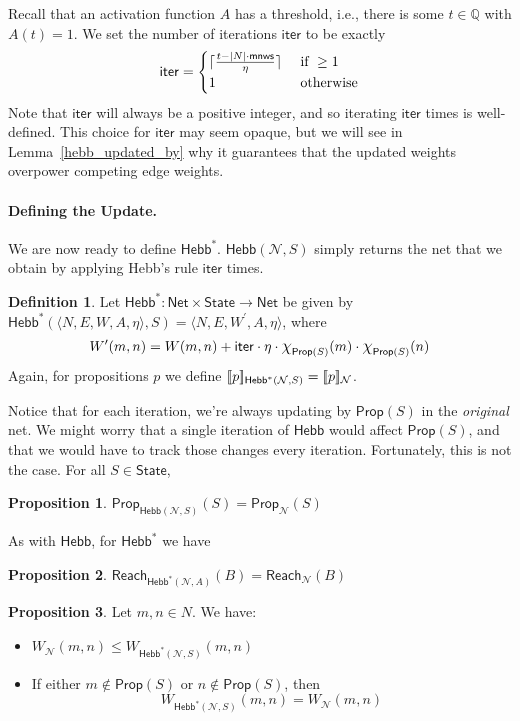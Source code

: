 \documentclass[letterpaper]{article}
\DeclarePairedDelimiter{\ceil}{\lceil}{\rceil}
\theoremstyle{definition}
\newtheorem{definition}{Definition}
\newtheorem{proposition}{Proposition}
\newcommand{\Rat}{\mathbb{Q}}
\newcommand{\State}{\mathsf{State}}
\newcommand{\semantics}[1]{[\![\mbox{\em $ #1 $\/}]\!]}
\newcommand*{\bigchi}{\mbox{\Large$\chi$}}%
\newcommand{\minscore}{\mathsf{mnws}}
\newcommand{\numiterations}{\mathsf{iter}}
\newcommand{\AllNets}{\mathsf{Net}}
\newcommand{\Net}{\mathcal{N}}
\newcommand{\Prop}{\mathsf{Prop}}
\newcommand{\Reach}{\mathsf{Reach}}
\newcommand{\Hebb}[2]{\mathsf{Hebb}(#1, #2)}
\newcommand{\HebbNoArgs}{\mathsf{Hebb}}
\newcommand{\Hebbstar}[2]{\mathsf{Hebb}^*(#1, #2)}
\newcommand{\HebbstarNoArgs}{\mathsf{Hebb}^*}
\begin{document}
Recall that an activation function $A$ has a threshold, i.e., there is some $t \in \Rat$ with $A(t) = 1$.  We set the number of iterations $\numiterations$ to be exactly
\[
    \numiterations = 
    \begin{cases}
        \ceil{\frac{t - |N| \cdot \minscore}{\eta}} & \mbox{ if } \geq 1\\
        1 & \mbox{ otherwise}
    \end{cases}
\]
Note that $\numiterations$ will always be a positive integer, and so iterating $\numiterations$ times is well-defined.  This choice for $\numiterations$ may seem opaque, but we will see in Lemma~\ref{hebb_updated_by} why it guarantees that the updated weights overpower competing edge weights.
 
\paragraph*{Defining the Update.}
We are now ready to define $\HebbstarNoArgs$.  $\Hebb{\Net}{S}$ simply returns the net that we obtain by applying Hebb's rule $\numiterations$ times.
\begin{definition}
    Let $\HebbstarNoArgs : \AllNets \times \State \to \AllNets$ be given by $\Hebbstar{\langle N, E, W, A, \eta \rangle}{S} = \langle N, E, W^\prime, A, \eta \rangle$, where
    \[
        W^\prime(m, n) = W(m, n) + \numiterations \cdot \eta \cdot \bigchi_{\Prop(S)}(m) \cdot \bigchi_{\Prop(S)}(n)
    \]
    Again, for propositions $p$ we define $\semantics{p}_{\Hebbstar{\Net}{S}} = \semantics{p}_\Net$.
\end{definition}
Notice that for each iteration, we're always updating by $\Prop(S)$ in the \emph{original} net.  We might worry that a single iteration of $\HebbNoArgs$ would affect $\Prop(S)$, and that we would have to track those changes every iteration.  Fortunately, this is not the case.  For all $S \in \State$,
\begin{proposition}
    $\Prop_{\Hebb{\Net}{S}}(S) = \Prop_\Net(S)$
\end{proposition}

As with $\HebbNoArgs$, for $\HebbstarNoArgs$ we have
\begin{proposition}\label{hebbstar_reach}
    $\Reach_{\Hebbstar{\Net}{A}}(B) = \Reach_\Net(B)$
\end{proposition}
\begin{proposition}\label{hebbstar_weights}
    Let $m, n \in N$.  We have:
    \begin{itemize}
        \item $W_\Net(m, n) \leq W_{\Hebbstar{\Net}{S}}(m, n)$
        \item If either $m \not \in \Prop(S)$ or $n \not \in \Prop(S)$, then
        \[ W_{\Hebbstar{\Net}{S}}(m, n) = W_\Net(m, n) \]
    \end{itemize}
\end{proposition}
\end{document}
